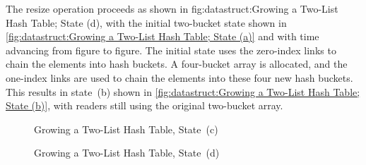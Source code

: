 The resize operation proceeds as shown in
{fig:datastruct:Growing a Two-List Hash Table; State (d)},
with the initial two-bucket state shown in
\cref{fig:datastruct:Growing a Two-List Hash Table; State (a)}
and with time advancing from figure to figure.
The initial state uses the zero-index links to chain the elements into
hash buckets.
A four-bucket array is allocated, and the one-index links are used to
chain the elements into these four new hash buckets.
This results in state~(b) shown in
\cref{fig:datastruct:Growing a Two-List Hash Table; State (b)},
with readers still using the original two-bucket array.

\begin{figure}[tb]
\centering
{}
\caption{Growing a Two-List Hash Table, State~(c)}
\label{fig:datastruct:Growing a Two-List Hash Table; State (c)}
\end{figure}

\begin{figure}[tb]
\centering
{}
\caption{Growing a Two-List Hash Table, State~(d)}
\label{fig:datastruct:Growing a Two-List Hash Table; State (d)}
\end{figure}

